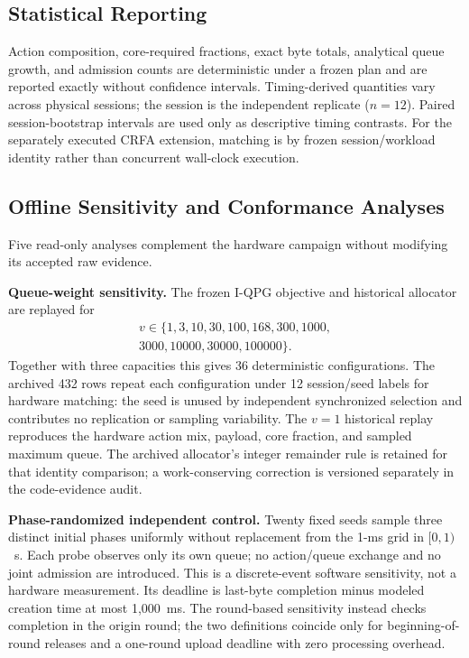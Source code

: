 \documentclass[10pt,journal]{IEEEtran}
\newcommand{\IQPG}{\textsc{I-QPG}}
\newcommand{\CRFA}{\textsc{CRFA}}
\begin{document}
\subsection{Statistical Reporting}
Action composition, core-required fractions, exact byte totals, analytical
queue growth, and admission counts are deterministic under a frozen plan and
are reported exactly without confidence intervals. Timing-derived quantities
vary across physical sessions; the session is the independent replicate
($n=12$). Paired session-bootstrap intervals are used only as descriptive
timing contrasts. For the separately executed \CRFA{} extension, matching is
by frozen session/workload identity rather than concurrent wall-clock
execution.

\subsection{Offline Sensitivity and Conformance Analyses}
Five read-only analyses complement the hardware campaign without modifying
its accepted raw evidence.

\textbf{Queue-weight sensitivity.}
The frozen \IQPG{} objective and historical allocator are replayed for
\begin{multline*}
v\in\{1,3,10,30,100,168,300,1000,\\
3000,10000,30000,100000\}.
\end{multline*}
Together with three capacities this gives 36 deterministic configurations.
The archived 432 rows repeat each configuration under 12 session/seed labels
for hardware matching: the seed is unused by independent synchronized
selection and contributes no replication or sampling variability. The
$v=1$ historical replay reproduces the hardware action mix, payload, core
fraction, and sampled maximum queue. The archived allocator's integer
remainder rule is retained for that identity comparison; a work-conserving
correction is versioned separately in the code-evidence audit.

\textbf{Phase-randomized independent control.}
Twenty fixed seeds sample three distinct initial phases uniformly without
replacement from the 1-ms grid in $[0,1)$~s.
Each probe observes only its own queue; no action/queue exchange and no joint
admission are introduced. This is a discrete-event software sensitivity, not
a hardware measurement. Its deadline is last-byte completion minus modeled
creation time at most 1,000~ms. The round-based sensitivity instead checks
completion in the origin round; the two definitions coincide only for
beginning-of-round releases and a one-round upload deadline with zero
processing overhead.
\end{document}
